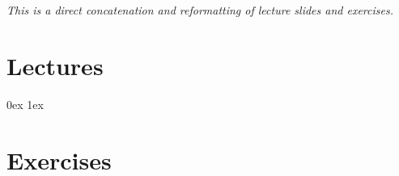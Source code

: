 \author{\teacher}
\renewcommand{\theauthor}{\teacher}

\renewcommand{\slides}[1][]{
  \subsection{\topic}
  \index{\topic}
  {\small #1}
  (slides by \teacher)
  \setcounter{mypage}{0}
  \smallskip\nopagebreak\hrule\medskip
}

\scripttitle

\emph{This is a direct concatenation and reformatting of lecture
    slides and exercises.}

\tableofcontents


\clearpage
\slidefont
\fancyhfoffset{0mm}

\section{Lectures}

















\clearpage
\fancyhfoffset{0mm}
\parindent 0ex
\parskip 1ex

\section{Exercises}





















